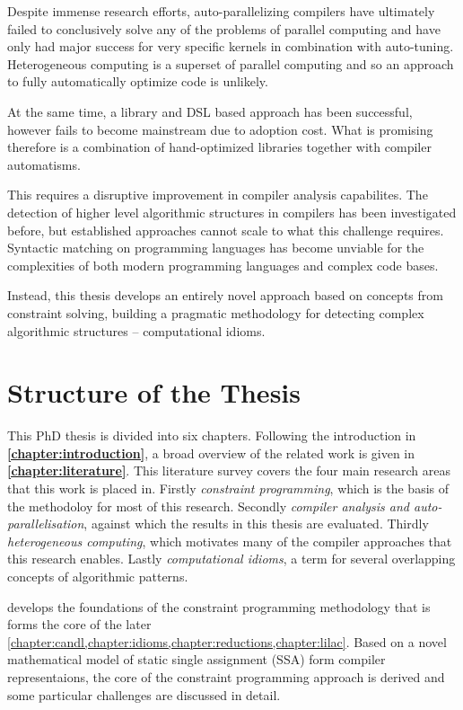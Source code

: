     Despite immense research efforts, auto-parallelizing compilers have
    ultimately failed to conclusively solve any of the problems of parallel
    computing and have only had major success for very specific kernels in
    combination with auto-tuning.
    Heterogeneous computing is a superset of parallel computing and so an
    approach to fully automatically optimize code is unlikely.

    At the same time, a library and DSL based approach has been successful,
    however fails to become mainstream due to adoption cost.
    What is promising therefore is a combination of hand-optimized libraries
    together with compiler automatisms.

    This requires a disruptive improvement in compiler analysis capabilites.
    The detection of higher level algorithmic structures in compilers has been
    investigated before, but established approaches cannot scale to what
    this challenge requires.
    Syntactic matching on programming languages has become
    unviable for the complexities of both modern programming languages and
    complex code bases.

    Instead, this thesis develops an entirely novel approach based on concepts
    from constraint solving, building a pragmatic methodology for detecting
    complex algorithmic structures -- computational idioms.

\pagebreak
\section{Structure of the Thesis}

    This PhD thesis is divided into six chapters.
    Following the introduction in {\bf\cref{chapter:introduction}}, a broad
    overview of the related work is given in {\bf\cref{chapter:literature}}.
    This literature survey covers the four main research areas that this work
    is placed in.
    Firstly {\em constraint programming}, which is the basis of the methodoloy
    for most of this research.
    Secondly {\em compiler analysis and auto-parallelisation}, against which the
    results in this thesis are evaluated.
    Thirdly {\em heterogeneous computing}, which motivates many of the compiler
    approaches that this research enables.
    Lastly {\em computational idioms}, a term for several overlapping concepts
    of algorithmic patterns.

    {\bf{}} develops the foundations of the constraint
    programming methodology that is forms the core of the later
    \cref{chapter:candl,chapter:idioms,chapter:reductions,chapter:lilac}.
    Based on a novel mathematical model of static single assignment (SSA) form
    compiler representaions, the core of the constraint programming approach
    is derived and some particular challenges are discussed in detail.

